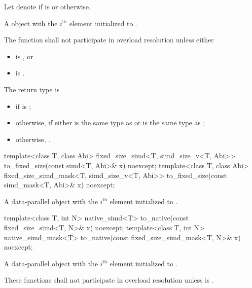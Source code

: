 \begin{itemdescr}
  \pnum
  Let  denote  if  is  or  otherwise.

  \pnum\returns
  A  object with the $i^\text{th}$ element initialized to  \foralli.

  \pnum\remarks
  The function shall not participate in overload resolution unless either
  \begin{itemize}
    \item {} is , or
    \item {} is .
  \end{itemize}

  \pnum
  The return type is
  \begin{itemize}
    \item {} if  is ;
    \item otherwise,  if either  is the same type as  or  is the same type as ;
    \item otherwise, .
  \end{itemize}
\end{itemdescr}

\begin{itemdecl}
template<class T, class Abi>
  fixed_size_simd<T, simd_size_v<T, Abi>> to_fixed_size(const simd<T, Abi>& x) noexcept;
template<class T, class Abi>
  fixed_size_simd_mask<T, simd_size_v<T, Abi>> to_fixed_size(const simd_mask<T, Abi>& x) noexcept;
\end{itemdecl}

\begin{itemdescr}
  \pnum\returns
  A data-parallel object with the $i^\text{th}$ element initialized to  \foralli.
\end{itemdescr}

\begin{itemdecl}
template<class T, int N> native_simd<T> to_native(const fixed_size_simd<T, N>& x) noexcept;
template<class T, int N> native_simd_mask<T> to_native(const fixed_size_simd_mask<T, N>& x) noexcept;
\end{itemdecl}

\begin{itemdescr}
  \pnum\returns
  A data-parallel object with the $i^\text{th}$ element initialized to  \foralli.

  \pnum\remarks
  These functions shall not participate in overload resolution unless  is .
\end{itemdescr}

